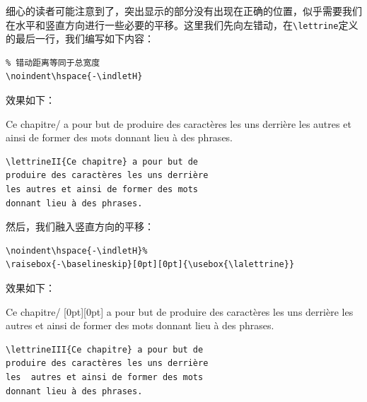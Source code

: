 细心的读者可能注意到了，突出显示的部分没有出现在正确的位置，似乎需要我们在水平和竖直方向进行一些必要的平移。这里我们先向左错动，在\verb|\lettrine|定义的最后一行，我们编写如下内容：

\begin{dmd}
\begin{verbatim}
% 错动距离等同于总宽度
\noindent\hspace{-\indletH}
\end{verbatim}
\end{dmd}

效果如下：

\newcommand{\lettrineII}[1]{%
  \creerlettrine#1/%
  \setlength{\larligH}{\textwidth-\indletH}%
  \setlength{\larligB}{\textwidth-\indletB}%
  \parshape=3%
  \indletH\larligH%
  \indletB\larligB%
  0cm\textwidth%
  \setlength{\fboxrule}{.5pt}\setlength{\fboxsep}{-.5pt}%
  \noindent\hspace{-\indletH}\fbox{\usebox{\lalettrine}}}

\begin{codelist}[11.26]{
\lettrineII{Ce chapitre} a pour but de
produire des caractères les uns derrière
les autres et ainsi de former des mots
donnant lieu à des phrases.
}\begin{verbatim}
\lettrineII{Ce chapitre} a pour but de
produire des caractères les uns derrière
les autres et ainsi de former des mots
donnant lieu à des phrases.
\end{verbatim}
\end{codelist}

然后，我们融入竖直方向的平移：

\begin{dmd}
\begin{verbatim}
\noindent\hspace{-\indletH}% 
\raisebox{-\baselineskip}[0pt][0pt]{\usebox{\lalettrine}}
\end{verbatim}
\end{dmd}

效果如下：

\newcommand{\lettrineIII}[1]{%
  \creerlettrine#1/%
  \setlength{\larligH}{\textwidth-\indletH}%
  \setlength{\larligB}{\textwidth-\indletB}%
  \parshape=3%
  \indletH\larligH%
  \indletB\larligB%
  0cm\textwidth%
  \setlength{\fboxrule}{.5pt}\setlength{\fboxsep}{-.5pt}%
  \noindent\hspace{-\indletH}%
  \raisebox{-\baselineskip}[0pt][0pt]{%
    \fbox{\usebox{\lalettrine}}}}

\begin{codelist}[11.27]{
\lettrineIII{Ce chapitre} a pour but de
produire des caractères les uns derrière
les  autres et ainsi de former des mots
donnant lieu à des phrases.
}\begin{verbatim}
\lettrineIII{Ce chapitre} a pour but de
produire des caractères les uns derrière
les  autres et ainsi de former des mots
donnant lieu à des phrases.
\end{verbatim}
\end{codelist}

